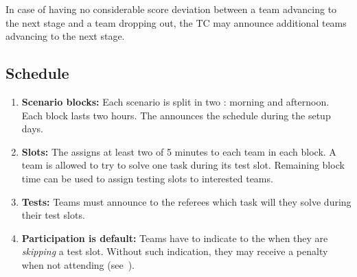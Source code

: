 In case of having no considerable score deviation between a team advancing to the next stage and a team dropping out, the TC may announce additional teams advancing to the next stage.


\subsection{Schedule}
\label{rule:schedule}

\begin{enumerate}
	\item \textbf{Scenario blocks:} Each scenario is split in two : morning and afternoon.
	Each block lasts two hours.
	The  announces the schedule during the setup days.

	\item \textbf{Slots:} The  assigns at least two  of 5 minutes to each team in each block.
	A team is allowed to try to solve one task during its test slot.
	Remaining block time can be used to assign testing slots to interested teams.

	\item \textbf{Tests:} Teams must announce to the referees which task will they solve during their test slots.

	\item \textbf{Participation is default:} Teams have to indicate to the  when they are \emph{skipping} a test slot. Without such indication, they may receive a penalty when not attending (see~).
\end{enumerate}

